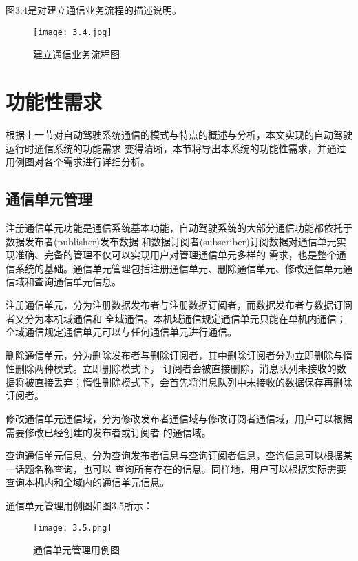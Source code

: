 图3.4是对建立通信业务流程的描述说明。
\begin{figure}[H]
  \centering
  \texttt{[image: 3.4.jpg]}
  \caption{建立通信业务流程图}
  \label{fig:16}
\end{figure}

\section{功能性需求}
根据上一节对自动驾驶系统通信的模式与特点的概述与分析，本文实现的自动驾驶运行时通信系统的功能需求
变得清晰，本节将导出本系统的功能性需求，并通过用例图对各个需求进行详细分析。

\subsection{通信单元管理}
注册通信单元功能是通信系统基本功能，自动驾驶系统的大部分通信功能都依托于数据发布者(publisher)发布数据
和数据订阅者(subscriber)订阅数据对通信单元实现准确、完备的管理不仅可以实现用户对管理通信单元多样的
需求，也是整个通信系统的基础。通信单元管理包括注册通信单元、删除通信单元、修改通信单元通信域和查询通信单元信息。

注册通信单元，分为注册数据发布者与注册数据订阅者，而数据发布者与数据订阅者又分为本机域通信和
全域通信。本机域通信规定通信单元只能在单机内通信；全域通信规定通信单元可以与任何通信单元进行通信。

删除通信单元，分为删除发布者与删除订阅者，其中删除订阅者分为立即删除与惰性删除两种模式。立即删除模式下，
订阅者会被直接删除，消息队列未接收的数据将被直接丢弃；惰性删除模式下，会首先将消息队列中未接收的数据保存再删除
订阅者。

修改通信单元通信域，分为修改发布者通信域与修改订阅者通信域，用户可以根据需要修改已经创建的发布者或订阅者
的通信域。

查询通信单元信息，分为查询发布者信息与查询订阅者信息，查询信息可以根据某一话题名称查询，也可以
查询所有存在的信息。同样地，用户可以根据实际需要查询本机内和全域内的通信单元信息。

通信单元管理用例图如图3.5所示：
\begin{figure}[H]
  \centering
  \texttt{[image: 3.5.png]}
  \caption{通信单元管理用例图}
  \label{fig:17}
\end{figure}

